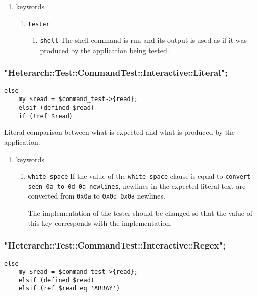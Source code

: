 \documentclass[11pt]{article}
\begin{document}
\begin{enumerate}
\item keywords
\label{sec-4-4-2-1}
\begin{enumerate}
\item \texttt{tester}
\label{sec-4-4-2-1-1}
\begin{enumerate}
\item \texttt{shell}
\label{sec-4-4-2-1-1-1}
The shell command is run and its output is used as if it was produced
by the application being tested.
\end{enumerate}
\end{enumerate}
\end{enumerate}

\subsubsection{"Heterarch::Test::CommandTest::Interactive::Literal";}
\label{sec-4-4-3}
\begin{verbatim}
else
    my $read = $command_test->{read};
    elsif (defined $read)
	if (!ref $read)
\end{verbatim}

Literal comparison between what is expected and what is produced by the application.

\begin{enumerate}
\item keywords
\label{sec-4-4-3-1}
\begin{enumerate}
\item \texttt{white\_space}
\label{sec-4-4-3-1-1}
If the value of the \verb~white_space~ clause is equal to \verb~convert seen 0a to 0d 0a newlines~, newlines in the expected literal text are
converted from \verb~0x0a~ to \verb~0x0d 0x0a~ newlines.

The implementation of the tester should be changed so that the value
of this key corresponds with the implementation.
\end{enumerate}
\end{enumerate}

\subsubsection{"Heterarch::Test::CommandTest::Interactive::Regex";}
\label{sec-4-4-4}
\begin{verbatim}
else
    my $read = $command_test->{read};
    elsif (defined $read)
	elsif (ref $read eq 'ARRAY')
\end{verbatim}
\end{document}
